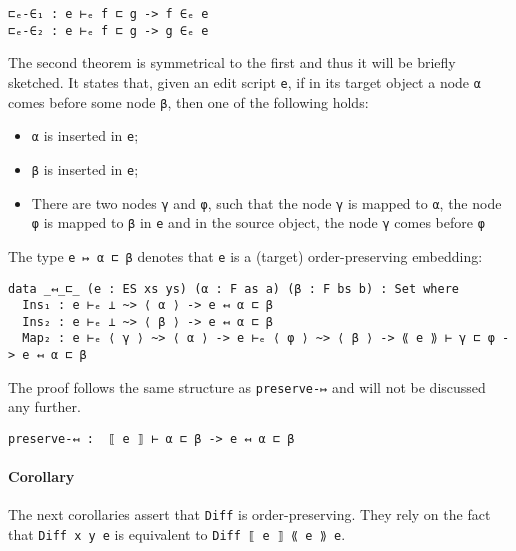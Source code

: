 \documentclass[../Thesis.tex]{subfiles}
\begin{document}
\begin{verbatim}
⊏ₑ-∈₁ : e ⊢ₑ f ⊏ g -> f ∈ₑ e
⊏ₑ-∈₂ : e ⊢ₑ f ⊏ g -> g ∈ₑ e
\end{verbatim}

	The second theorem is symmetrical to the first and thus it will be briefly 
	sketched.
	It states that, given an edit script \texttt{e}, if in its
	target object a node \texttt{α} comes before
	some node \texttt{β}, then one of the following holds:
	\begin{itemize}
		\item \texttt{α} is inserted in \texttt{e};
		\item \texttt{β} is inserted in \texttt{e};
		\item There are two nodes \texttt{γ} and \texttt{φ}, such that the node 
		\texttt{γ} is mapped to \texttt{α}, the node \texttt{φ} is mapped to 
		\texttt{β} in 	\texttt{e} and in the source object, 
		the node \texttt{γ} comes before \texttt{φ}
	\end{itemize}

	The type \texttt{e ↦ α ⊏ β} denotes that \texttt{e} is a (target) 
	order-preserving embedding:

\begin{verbatim}
data _↤_⊏_ (e : ES xs ys) (α : F as a) (β : F bs b) : Set where
  Ins₁ : e ⊢ₑ ⊥ ~> ⟨ α ⟩ -> e ↤ α ⊏ β
  Ins₂ : e ⊢ₑ ⊥ ~> ⟨ β ⟩ -> e ↤ α ⊏ β
  Map₂ : e ⊢ₑ ⟨ γ ⟩ ~> ⟨ α ⟩ -> e ⊢ₑ ⟨ φ ⟩ ~> ⟨ β ⟩ -> ⟪ e ⟫ ⊢ γ ⊏ φ -> e ↤ α ⊏ β
\end{verbatim}
         
	The proof follows the same structure as \texttt{preserve-↦} 
	and will not be discussed any further.
\begin{verbatim}
preserve-↤ :  ⟦ e ⟧ ⊢ α ⊏ β -> e ↤ α ⊏ β 
\end{verbatim}
	
	\paragraph{Corollary}
	The next corollaries assert that \texttt{Diff} is order-preserving.
 	They rely on the fact that \texttt{Diff x y e} is equivalent to
	\texttt{Diff ⟦ e ⟧ ⟪ e ⟫ e}.
\end{document}
